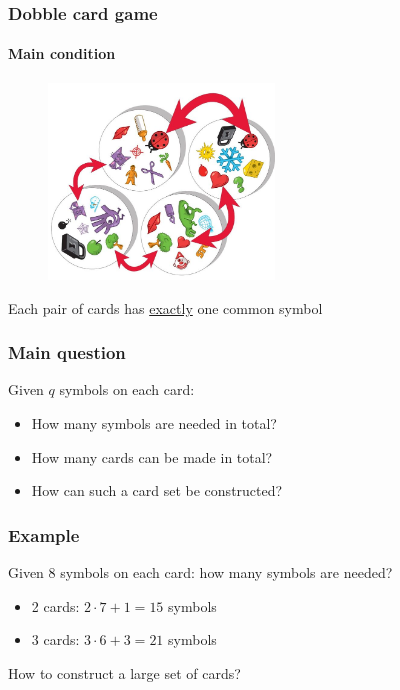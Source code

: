 \documentclass{beamer}
\begin{document}
  \begin{frame}
    \frametitle{Dobble card game}
    \framesubtitle{Main condition}
    \begin{figure}
    	\vspace{-1cm}
    	\includegraphics[width=6cm]{images/dobble_unique}
    \end{figure}
    \centering
    Each pair of cards has \underline{exactly} one common symbol
  \end{frame}

  \begin{frame}
  	\frametitle{Main question}
	Given $q$ symbols on each card:
	\begin{itemize}
		\item How many symbols are needed in total?
		\item How many cards can be made in total?
		\item How can such a card set be constructed?
	\end{itemize}
  \end{frame}
  
  \begin{frame}
  	\frametitle{Example}
	Given $8$ symbols on each card: how many symbols are needed?
	\begin{itemize}
		\item 2 cards: $2\cdot 7 + 1 = 15$ symbols
			\begin{center}
			\end{center}
		\item 3 cards: $3\cdot 6 + 3 = 21$ symbols
			\begin{center}
			\end{center}
	\end{itemize}
	\vspace{0.7cm}
	How to construct a large set of cards?
  \end{frame}
  
\end{document}
